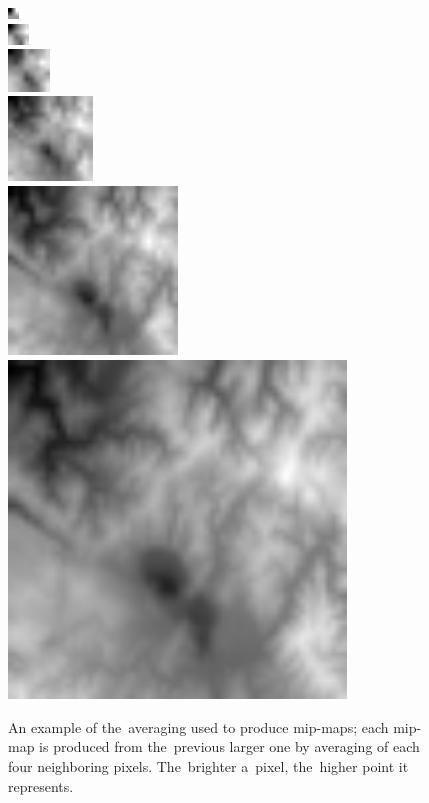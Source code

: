\begin{figure}
	\centering
	\includegraphics[width=0.025\textwidth]{figures/1.png} \\ 
	\includegraphics[width=0.05\textwidth]{figures/2.png} \\ 
	\includegraphics[width=0.1\textwidth]{figures/3.png} \\ 
	\includegraphics[width=0.2\textwidth]{figures/4.png} \\ 
	\includegraphics[width=0.4\textwidth]{figures/5.png} \\ 
	\includegraphics[width=0.8\textwidth]{figures/6.png}
	\caption{An example of the~averaging used to produce mip-maps; each mip-map is produced from the~previous larger one by averaging of each four neighboring pixels. The~brighter a~pixel, the~higher point it represents.}
	\label{fig:averaging}
\end{figure}


